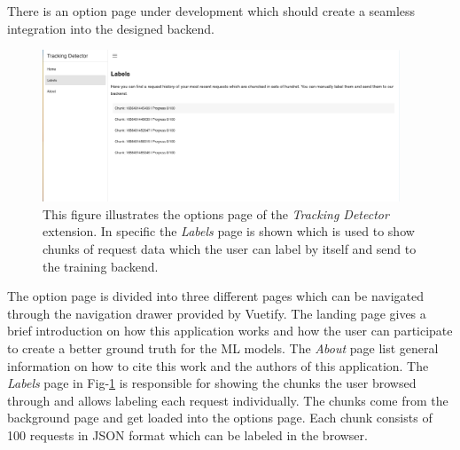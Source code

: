 There is an option page under development which should create a seamless integration into the designed backend.
\begin{figure}
  \begin{center}
    \includegraphics[width=0.95\textwidth]{images/LabelsPage.png}
  \end{center}
  \caption{This figure illustrates the options page of the \emph{Tracking Detector} extension. In specific the \emph{Labels} page is shown which 
  is used to show chunks of request data which the user can label by itself and send to the training backend.}
  \label{fig:LabelsPage}
\end{figure}
The option page is divided into three different pages which can be navigated through the navigation drawer provided by Vuetify. The landing 
page gives a brief introduction on how this application works and how the user can participate to create a better ground truth for the ML models.
The \emph{About} page list general information on how to cite this work and the authors of this application. The \emph{Labels} page in Fig-\ref{fig:LabelsPage} is responsible
for showing the chunks the user browsed through and allows labeling each request
individually. The chunks come from the background page and get loaded into the options page. Each chunk consists of 100 requests in JSON format 
which can be labeled in the browser. 
